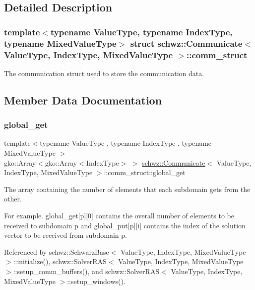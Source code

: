 \subsection{Detailed Description}
\subsubsection*{template$<$typename Value\+Type, typename Index\+Type, typename Mixed\+Value\+Type$>$\newline
struct schwz\+::\+Communicate$<$ Value\+Type, Index\+Type, Mixed\+Value\+Type $>$\+::comm\+\_\+struct}

The communication struct used to store the communication data. 

\subsection{Member Data Documentation}
\mbox{\label{structschwz_1_1Communicate_1_1comm__struct_a3b209dc2a9b9f28cc10af56fa197c1e1}} 
\subsubsection{\texorpdfstring{global\+\_\+get}{global\_get}}
{\footnotesize\ttfamily template$<$typename Value\+Type , typename Index\+Type , typename Mixed\+Value\+Type $>$ \\
gko\+::\+Array$<$gko\+::\+Array$<$Index\+Type$>$ $>$ \hyperlink{classschwz_1_1Communicate}{schwz\+::\+Communicate}$<$ Value\+Type, Index\+Type, Mixed\+Value\+Type $>$\+::comm\+\_\+struct\+::global\+\_\+get}



The array containing the number of elements that each subdomain gets from the other. 

For example. global\+\_\+get\mbox{[}p\mbox{]}\mbox{[}0\mbox{]} contains the overall number of elements to be received to subdomain p and global\+\_\+put\mbox{[}p\mbox{]}\mbox{[}i\mbox{]} contains the index of the solution vector to be received from subdomain p. 

Referenced by schwz\+::\+Schwarz\+Base$<$ Value\+Type, Index\+Type, Mixed\+Value\+Type $>$\+::initialize(), schwz\+::\+Solver\+R\+A\+S$<$ Value\+Type, Index\+Type, Mixed\+Value\+Type $>$\+::setup\+\_\+comm\+\_\+buffers(), and schwz\+::\+Solver\+R\+A\+S$<$ Value\+Type, Index\+Type, Mixed\+Value\+Type $>$\+::setup\+\_\+windows().

